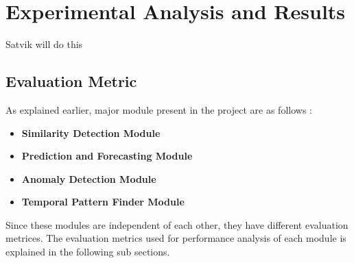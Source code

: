 \documentclass[12pt]{report}
\begin{document}
\chapter{Experimental Analysis and Results}
Satvik will do this
\section{Evaluation Metric}
As explained earlier, major module present in the project are as follows :
\begin{itemize}
\item \textbf{Similarity Detection Module}
\item \textbf{Prediction and Forecasting Module}
\item \textbf{Anomaly Detection Module}
\item \textbf{Temporal Pattern Finder Module}
\end{itemize}

Since these modules are independent of each other, they have different evaluation metrices. The evaluation metrics used for performance analysis of each module is explained in the following sub sections.
\end{document}
